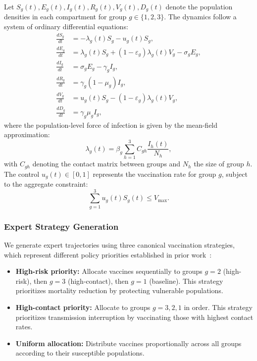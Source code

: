 Let $S_g(t), E_g(t), I_g(t), R_g(t), V_g(t), D_g(t)$ denote the population densities
in each compartment for group $g \in \{1,2,3\}$. The dynamics follow a system of
ordinary differential equations:
\begin{align}
\frac{dS_g}{dt} &= -\lambda_g(t) S_g - u_g(t) S_g, \\
\frac{dE_g}{dt} &= \lambda_g(t) S_g + (1-\varepsilon_g)\lambda_g(t) V_g - \sigma_g E_g, \\
\frac{dI_g}{dt} &= \sigma_g E_g - \gamma_g I_g, \\
\frac{dR_g}{dt} &= \gamma_g(1-\mu_g) I_g, \\
\frac{dV_g}{dt} &= u_g(t) S_g - (1-\varepsilon_g)\lambda_g(t) V_g, \\
\frac{dD_g}{dt} &= \gamma_g \mu_g I_g,
\end{align}
where the population-level force of infection is given by the mean-field approximation:
\begin{equation}
\lambda_g(t) = \beta_g \sum_{h=1}^3 C_{gh} \frac{I_h(t)}{N_h},
\label{eq:ode_foi}
\end{equation}
with $C_{gh}$ denoting the contact matrix between groups and $N_h$ the size of group $h$.
The control $u_g(t) \in [0,1]$ represents the vaccination rate for group $g$, subject
to the aggregate constraint:
\begin{equation}
\sum_{g=1}^3 u_g(t) S_g(t) \leq V_{\max}.
\label{eq:ode_constraint}
\end{equation}

\subsubsection{Expert Strategy Generation}

We generate expert trajectories using three canonical vaccination strategies, which
represent different policy priorities established in prior work~\citep{师兄论文}:

\begin{itemize}
    \item \textbf{High-risk priority:} Allocate vaccines sequentially to groups
    $g=2$ (high-risk), then $g=3$ (high-contact), then $g=1$ (baseline). This
    strategy prioritizes mortality reduction by protecting vulnerable populations.

    \item \textbf{High-contact priority:} Allocate to groups $g=3, 2, 1$ in order.
    This strategy prioritizes transmission interruption by vaccinating those with
    highest contact rates.

    \item \textbf{Uniform allocation:} Distribute vaccines proportionally across
    all groups according to their susceptible populations.
\end{itemize}

